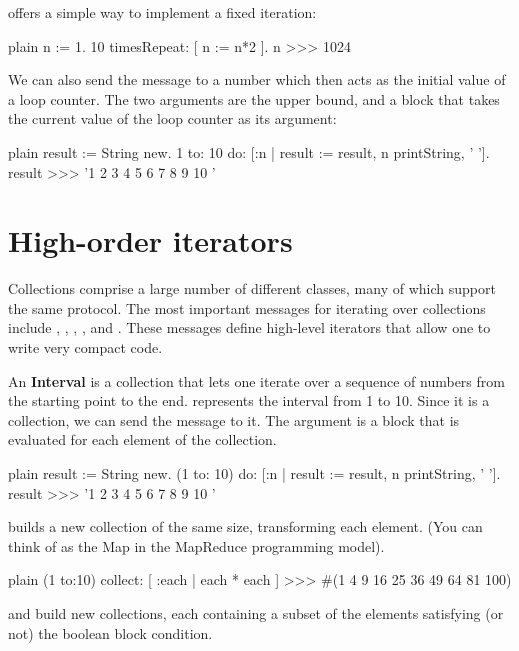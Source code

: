 \documentclass[10pt,twoside,english]{_support/latex/sbabook/sbabook}
\begin{document}
 offers a simple way to implement a fixed iteration:

\begin{displaycode}{plain}
n := 1.
10 timesRepeat: [ n := n*2 ].
n 
>>> 1024
\end{displaycode}

We can also send the message  to a number which then acts as the
initial value of a loop counter. The two arguments are the upper bound, and a
block that takes the current value of the loop counter as its argument:

\begin{displaycode}{plain}
result := String new.
1 to: 10 do: [:n | result := result, n printString, ' '].
result 
>>> '1 2 3 4 5 6 7 8 9 10 '
\end{displaycode}
\section{High-order iterators}
Collections comprise a large number of different
classes, many of which support the same protocol. The most important messages
for iterating over collections include , , ,
,  and . These messages define high-level
iterators that allow one to write very compact code.

An \textbf{Interval} is a collection that lets one iterate over a sequence of numbers
from the starting point to the end.  represents the interval from 1
to 10. Since it is a collection, we can send the message  to it. The argument
is a block that is evaluated for each element of the collection.

\begin{displaycode}{plain}
result := String new.
(1 to: 10) do: [:n | result := result, n printString, ' '].
result 
>>> '1 2 3 4 5 6 7 8 9 10 '
\end{displaycode}

 builds a new collection of the same size, transforming each
element. (You can think of  as the Map in the MapReduce
programming model).

\begin{displaycode}{plain}
(1 to:10) collect: [ :each | each * each ] 
>>> #(1 4 9 16 25 36 49 64 81 100)
\end{displaycode}

 and  build new collections, each containing a subset of
the elements satisfying (or not) the boolean block condition.
\end{document}
